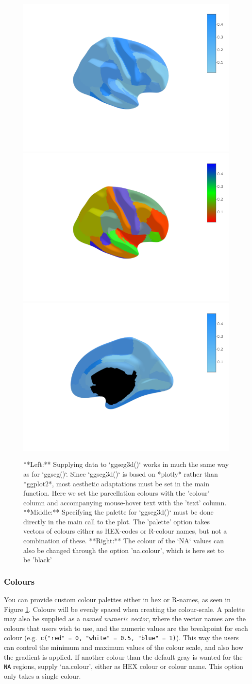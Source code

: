 \documentclass[fleqn,10pt]{wlpeerj} %
\begin{document}
\begin{figure}[H]
\includegraphics[width=0.3\linewidth]{png/ggseg3d_data} \includegraphics[width=0.3\linewidth]{png/ggseg3d_colour} \includegraphics[width=0.3\linewidth]{png/ggseg3d_nacolour} \caption{**Left:** Supplying data to `ggseg3d()` works in much the same way as for `ggseg()`. Since `ggseg3d()` is based on *plotly* rather than *ggplot2*, most aesthetic adaptations must be set in the main function. Here we set the parcellation colours with the 'colour' column and accompanying mouse-hover text with the 'text' column. **Middle:** Specifying the palette for `ggseg3d()` must be done directly in the main call to the plot. The 'palette' option takes vectors of colours either as HEX-codes or R-colour names, but not a combination of these. **Right:** The colour of the `NA` values can also be changed through the option 'na.colour', which is here set to be 'black'}\label{fig:ggseg3d-data1}
\end{figure}

\hypertarget{colours}{%
\subsubsection{Colours}\label{colours}}

You can provide custom colour palettes either in hex or R-names, as seen in Figure \ref{fig:ggseg3d-data1}.
Colours will be evenly spaced when creating the colour-scale.
A palette may also be supplied as a \emph{named numeric vector}, where the vector names are the colours that users wish to use, and the numeric values are the breakpoint for each colour (e.g.~\texttt{c("red"\ =\ 0,\ "white"\ =\ 0.5,\ "blue"\ =\ 1)}).
This way the users can control the minimum and maximum values of the colour scale, and also how the gradient is applied.
If another colour than the default gray is wanted for the \texttt{NA} regions, supply `na.colour', either as HEX colour or colour name.
This option only takes a single colour.
\end{document}
